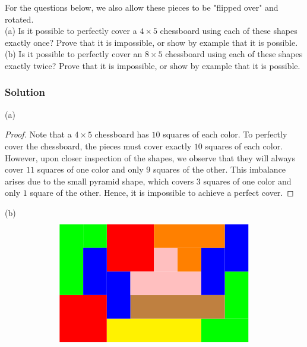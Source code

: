 \documentclass{article}
\begin{document}
For the questions below, we also allow these pieces to be "flipped over" and rotated. \\

\noindent (a) Is it possible to perfectly cover a $4 \times 5$ chessboard using each of these shapes exactly once? Prove that it is impossible, or show by example that it is possible.\\

\noindent (b) Is it possible to perfectly cover an $8 \times 5$ chessboard using each of these shapes exactly twice? Prove that it is impossible, or show by example that it is possible.\\

\subsubsection*{Solution}

(a) 
\begin{proof}
    Note that a $4 \times 5$ chessboard has $10$ squares of each color. To perfectly cover the chessboard, the pieces must cover exactly $10$ squares of each color. However, upon closer inspection of the shapes, we observe that they will always cover $11$ squares of one color and only $9$ squares of the other. This imbalance arises due to the small pyramid shape, which covers $3$ squares of one color and only $1$ square of the other. Hence, it is impossible to achieve a perfect cover.
    
\end{proof}

\noindent (b) 
\[
\begin{tikzpicture}

\fill[red] (0,0) rectangle (2,2);   
\fill[red] (2,3) rectangle (4,5);   

\fill[green] (0,2) rectangle (1,5);   
\fill[green] (1,4) rectangle (2,5);   

\fill[green] (6,0) rectangle (8,1);   
\fill[green] (7,1) rectangle (8,3);  

\fill[yellow] (2,0) rectangle (6,1);   
\fill[brown] (3,1) rectangle (7,2);   

\fill[blue] (1,2) rectangle (2,4);   
\fill[blue] (2,1) rectangle (3,3);   

\fill[blue] (6,2) rectangle (7,4);   
\fill[blue] (7,3) rectangle (8,5);   

\fill[pink] (3,2) rectangle (6,3);   
\fill[pink] (4,3) rectangle (5,4);  

\fill[orange] (4,4) rectangle (7,5);   
\fill[orange] (5,3) rectangle (6,4);  

\end{tikzpicture} \]
\end{document}
